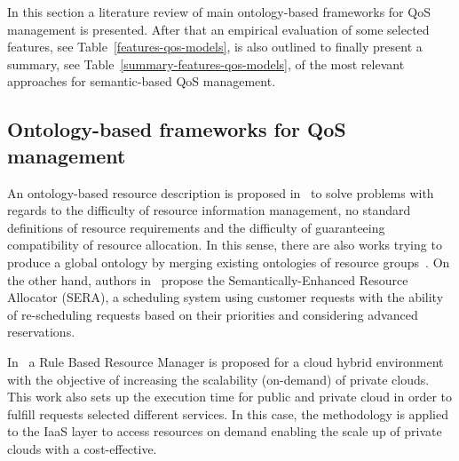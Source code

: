 In this section a literature review of main ontology-based frameworks for QoS management is presented. After that 
an empirical evaluation of some selected features, see Table~\ref{features-qos-models}, is also outlined to finally present 
a summary, see Table~\ref{summary-features-qos-models}, of the most relevant approaches for semantic-based QoS management.
\subsection{Ontology-based frameworks for QoS management}
An ontology-based resource description is proposed in~\cite{Pernas:2005:UOD:1068510.1069326,Armstrong17} to solve problems with regards to the difficulty of 
resource information management, no standard definitions of resource requirements and the difficulty of guaranteeing compatibility of resource allocation. 
In this sense, there are also works trying to produce a global ontology by merging existing ontologies of 
resource groups~\cite{Lopes:2006:PEM:1135771.1136110}. On the other hand, authors in~\cite{Ejarque:2008:USR:1443230.1444322} propose 
the Semantically-Enhanced Resource Allocator (SERA), a scheduling system using customer requests with the ability of re-scheduling 
requests based on their priorities and considering advanced reservations.


In~\cite{rule-2013-resource-provisioning} a Rule Based Resource Manager is proposed for a cloud hybrid environment 
with the objective of increasing the scalability (on-demand) of private clouds. This work also sets up the execution time 
for public and private cloud in order to fulfill requests selected different services. In this case, the methodology is applied to 
the IaaS layer to access resources on demand enabling the scale up of private clouds with a cost-effective.


